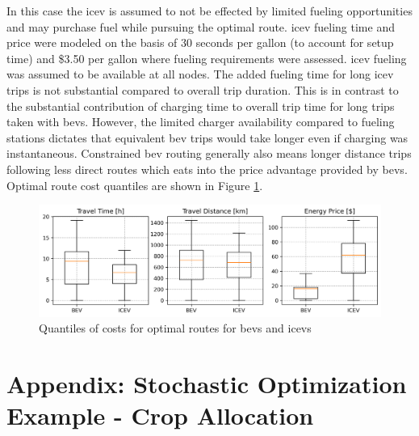\documentclass[12pt]{article}
\begin{document}
In this case the \gls{icev} is assumed to not be effected by limited fueling opportunities and may purchase fuel while pursuing the optimal route. \gls{icev} fueling time and price were modeled on the basis of 30 seconds per gallon (to account for setup time) and \$3.50 per gallon where fueling requirements were assessed. \gls{icev} fueling was assumed to be available at all nodes. The added fueling time for long \gls{icev} trips is not substantial compared to overall trip duration. This is in contrast to the substantial contribution of charging time to overall trip time for long trips taken with \glspl{bev}. However, the limited charger availability compared to fueling stations dictates that equivalent \gls{bev} trips would take longer even if charging was instantaneous. Constrained \gls{bev} routing generally also means longer distance trips following less direct routes which eats into the price advantage provided by \glspl{bev}. Optimal route cost quantiles are shown in Figure \ref{fig:routes_boxplots}.

\begin{figure}[H]
	\centering
	\includegraphics[width = \linewidth]{figs/routes_boxplots.png}
	\caption{Quantiles of costs for optimal routes for \glspl{bev} and \glspl{icev}}
	\label{fig:routes_boxplots}
\end{figure}

\bigskip

%
%


\appendix

\section*{Appendix: Stochastic Optimization Example - Crop Allocation}
\end{document}
